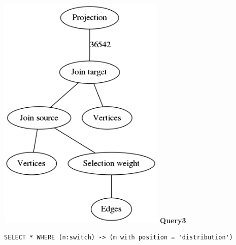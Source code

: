 \documentclass[11pt,singlecolumn]{scrartcl}
\begin{document}
\includegraphics[width=0.6\textwidth]{graph2}
\clearpage
\textbf{Query3}\\
\begin{verbatim}
SELECT * WHERE (n:switch) -> (m with position = 'distribution')\end{verbatim}
\end{document}
